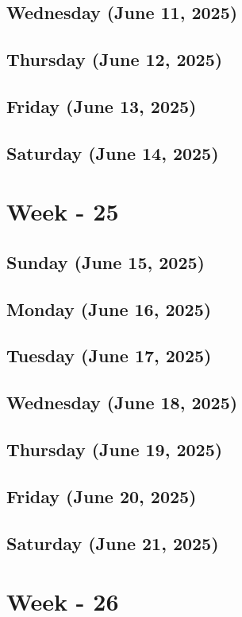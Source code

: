 \subsection*{Wednesday (June 11, 2025)}
\subsection*{Thursday (June 12, 2025)}
\subsection*{Friday (June 13, 2025)}
\subsection*{Saturday (June 14, 2025)}

\section{Week - 25}
\subsection*{Sunday (June 15, 2025)}
\subsection*{Monday (June 16, 2025)}
\subsection*{Tuesday (June 17, 2025)}
\subsection*{Wednesday (June 18, 2025)}
\subsection*{Thursday (June 19, 2025)}
\subsection*{Friday (June 20, 2025)}
\subsection*{Saturday (June 21, 2025)}

\section{Week - 26}
